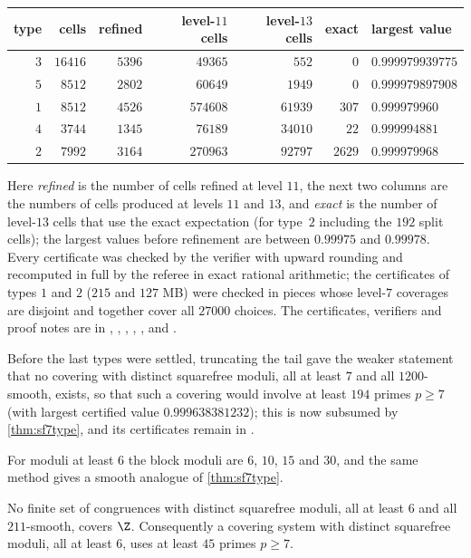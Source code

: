 \begin{center}
\begin{tabular}{@{}rrrrrrl@{}}
\toprule
type & cells & refined & level-$11$ cells & level-$13$ cells & exact & largest value \\
\midrule
$3$ & $16416$ & $5396$ & $49365$ & $552$ & $0$ & $0.999979939775$ \\
$5$ & $8512$ & $2802$ & $60649$ & $1949$ & $0$ & $0.999979897908$ \\
$1$ & $8512$ & $4526$ & $574608$ & $61939$ & $307$ & $0.999979960$ \\
$4$ & $3744$ & $1345$ & $76189$ & $34010$ & $22$ & $0.999994881$ \\
$2$ & $7992$ & $3164$ & $270963$ & $92797$ & $2629$ & $0.999979968$ \\
\bottomrule
\end{tabular}
\end{center}
Here \emph{refined} is the number of cells refined at level $11$, the next two columns are the numbers of cells
produced at levels $11$ and $13$, and \emph{exact} is the number of level-$13$ cells that use the exact expectation
(for type~$2$ including the $192$ split cells); the largest values before refinement are between $0.99975$ and
$0.99978$. Every certificate was checked by the verifier with
upward rounding and recomputed in full by the referee in exact rational arithmetic; the certificates of types $1$ and
$2$ ($215$ and $127$ MB) were checked in pieces whose level-$7$ coverages are disjoint and together cover all
$27000$ choices. The certificates, verifiers and proof notes are in ,
, , ,
,  and .

Before the last types were settled, truncating the tail gave the weaker statement that no covering with distinct
squarefree moduli, all at least $7$ and all $1200$-smooth, exists, so that such a covering would involve at least
$194$ primes $p\ge7$ (with largest certified value $0.999638381232$); this is now subsumed by
\cref{thm:sf7type}, and its certificates remain in .

For moduli at least $6$ the block moduli are $6$, $10$, $15$ and $30$, and the same method gives a smooth analogue
of \cref{thm:sf7type}.

\begin{theorem}\label{thm:sf6smooth}
No finite set of congruences with distinct squarefree moduli, all at least $6$ and all $211$-smooth, covers $\Z$.
Consequently a covering system with distinct squarefree moduli, all at least $6$, uses at least $45$ primes $p\ge7$.
\end{theorem}

